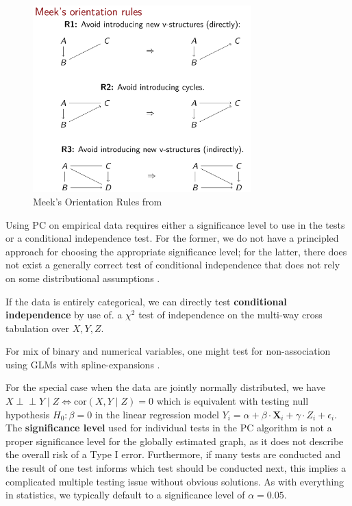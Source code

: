 \documentclass{article}
\newcommand{\indep}{\perp\!\!\!\!\perp}
\newcommand{\X}{\mathbf{X}}
\begin{document}
	\begin{figure}[H]
		\centering
		\includegraphics[width=0.75\textwidth]{images/Meek's Orientation Rules}
		\caption{Meek's Orientation Rules from \cite{petersen2024}}
		\label{fig:meeks_orientation}
	\end{figure}
	
	Using PC on empirical data requires either a significance level to use in the tests or a conditional independence test. For the former, we do not have a principled approach for choosing the appropriate significance level; for the latter, there does not exist a generally correct test of conditional independence that does not rely on some distributional assumptions \cite{shah2020}.
		
	If the data is entirely categorical, we can directly test \textbf{conditional independence} by use of. a $\chi^2$ test of independence on the multi-way cross tabulation over $X, Y, Z$.
	
	For mix of binary and numerical variables, one might test
	for non-association using GLMs with spline-expansions \cite{petersen2021}.
	
	For the special case when the data are jointly normally distributed, we have $X \indep Y \mid Z \Leftrightarrow \text{cor}(X, Y \mid Z) = 0$ which is equivalent with testing null hypothesis $H_0 : \beta = 0$ in the linear regression model $Y_i = \alpha + \beta \cdot \X_i + \gamma \cdot Z_i + \epsilon_i$. \\
	
	The \textbf{significance level} used for individual tests in the PC algorithm is not a proper significance level for the globally estimated graph, as it does not describe the overall risk of a Type I error. Furthermore, if many tests are conducted and the result of one test informs which test should be conducted next, this implies a complicated multiple testing issue without obvious solutions. As with everything in statistics, we typically default to a significance level of $\alpha = 0.05$.
	 
\end{document}
